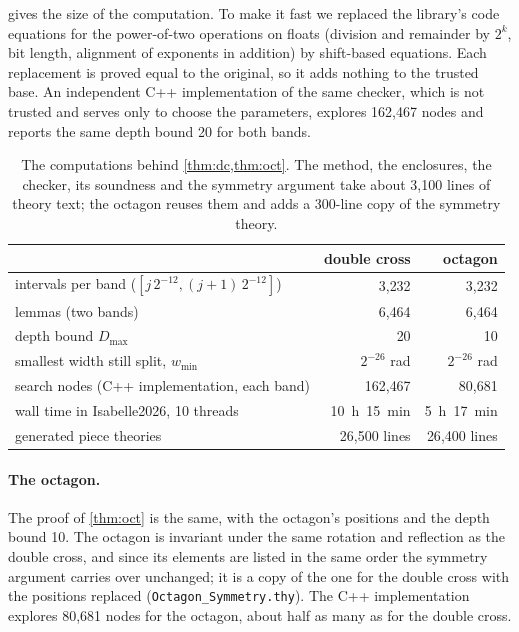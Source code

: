 \documentclass[11pt]{amsart}
\theoremstyle{plain}
\theoremstyle{definition}
\newcommand{\thy}[1]{\texttt{#1}}
\begin{document}



 gives the size of the computation.  To make it fast we replaced the library's
code equations for the power-of-two operations on floats (division and remainder by $2^k$, bit
length, alignment of exponents in addition) by shift-based equations.  Each replacement is proved
equal to the original, so it adds nothing to the trusted base.  An independent C++ implementation of
the same checker, which is not trusted and serves only to choose the parameters, explores
162{,}467 nodes and reports the same depth bound 20 for both bands.

\begin{table}[t]
\centering\small
\begin{tabular}{@{}lrr@{}}
\toprule
 & double cross & octagon\\
\midrule
intervals per band ($[j\,2^{-12}, (j+1)\,2^{-12}]$) & 3{,}232 & 3{,}232\\
lemmas (two bands) & 6{,}464 & 6{,}464\\
depth bound $D_{\max}$ & 20 & 10\\
smallest width still split, $w_{\min}$ & $2^{-26}$ rad & $2^{-26}$ rad\\
search nodes (C++ implementation, each band) & 162{,}467 & 80{,}681\\
wall time in Isabelle2026, 10 threads & 10~h~15~min & 5~h~17~min\\
generated piece theories & 26{,}500 lines & 26{,}400 lines\\
\bottomrule
\end{tabular}
\caption{The computations behind \cref{thm:dc,thm:oct}.  The method, the enclosures, the checker,
its soundness and the symmetry argument take about 3{,}100 lines of theory text; the octagon reuses
them and adds a 300-line copy of the symmetry theory.}
\label{tab:computation}
\end{table}

\paragraph{The octagon.}  The proof of \cref{thm:oct} is the same, with the octagon's positions and
the depth bound 10.  The octagon is invariant under the same rotation and reflection as the double
cross, and since its elements are listed in the same order the symmetry argument carries over
unchanged; it is a copy of the one for the double cross with the positions replaced
(\thy{Octagon\_Symmetry.thy}).  The C++ implementation explores 80{,}681 nodes for the octagon,
about half as many as for the double cross.
\end{document}
